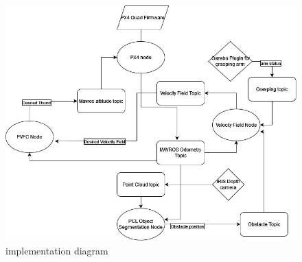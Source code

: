 \begin{figure}[h!]
    \centering
    \includegraphics[width=\linewidth]{Images/implementation diagram.jpg}
    \caption{implementation diagram}
    \label{fig:implementationdiagram}
\end{figure}

